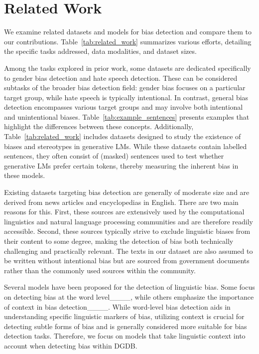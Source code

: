 \section{Related Work}
\label{sec:related_work}

We examine related datasets and models for bias detection and compare them to our contributions. Table~\ref{tab:related_work} summarizes various efforts, detailing the specific tasks addressed, data modalities, and dataset sizes.

Among the tasks explored in prior work, some datasets are dedicated specifically to gender bias detection and hate speech detection. These can be considered subtasks of the broader bias detection field: gender bias focuses on a particular target group, while hate speech is typically intentional. In contrast, general bias detection encompasses various target groups and may involve both intentional and unintentional biases. Table~\ref{tab:example_sentences} presents examples that highlight the differences between these concepts. Additionally, Table~\ref{tab:related_work} includes datasets designed to study the existence of biases and stereotypes in generative LMs. 
While these datasets contain labelled sentences, they often consist of (masked) sentences used to test whether generative LMs prefer certain tokens, thereby measuring the inherent bias in these models.

Existing datasets targeting bias detection are generally of moderate size and are derived from news articles and encyclopedias in English. There are two main reasons for this. First, these sources are extensively used by the computational linguistics and natural language processing communities and are therefore readily accessible. Second, these sources typically strive to exclude linguistic biases from their content to some degree, making the detection of bias both technically challenging and practically relevant. The texts in our dataset are also assumed to be written without intentional bias but are sourced from government documents rather than the commonly used sources within the community.

Several models have been proposed for the detection of linguistic bias. Some focus on detecting bias at the word level____, while others emphasize the importance of context in bias detection____. While word-level bias detection aids in understanding specific linguistic markers of bias, utilizing context is crucial for detecting subtle forms of bias and is generally considered more suitable for bias detection tasks. Therefore, we focus on models that take linguistic context into account when detecting bias within DGDB.